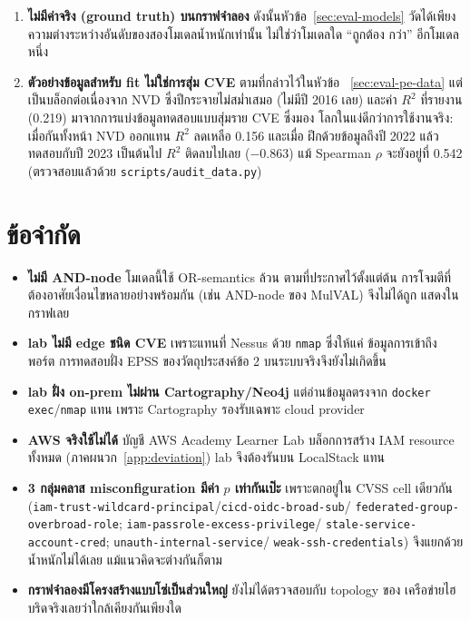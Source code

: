 \begin{enumerate}[leftmargin=1.6em]
\item \textbf{ไม่มีค่าจริง (ground truth) บนกราฟจำลอง} ดังนั้นหัวข้อ~\ref{sec:eval-models}
วัดได้เพียงความต่างระหว่างอันดับของสองโมเดลน้ำหนักเท่านั้น ไม่ใช่ว่าโมเดลใด ``ถูกต้อง
กว่า'' อีกโมเดลหนึ่ง

\item \textbf{ตัวอย่างข้อมูลสำหรับ fit ไม่ใช่การสุ่ม CVE} ตามที่กล่าวไว้ในหัวข้อ~
\ref{sec:eval-pe-data} แต่เป็นบล็อกต่อเนื่องจาก NVD ซึ่งปีกระจายไม่สม่ำเสมอ (ไม่มีปี 2016
เลย) และค่า $R^2$ ที่รายงาน (0.219) มาจากการแบ่งข้อมูลทดสอบแบบสุ่มราย CVE ซึ่งมอง
โลกในแง่ดีกว่าการใช้งานจริง: เมื่อกันทั้งหน้า NVD ออกแทน $R^2$ ลดเหลือ 0.156 และเมื่อ
ฝึกด้วยข้อมูลถึงปี 2022 แล้วทดสอบกับปี 2023 เป็นต้นไป $R^2$ ติดลบไปเลย ($-0.863$) แม้
Spearman $\rho$ จะยังอยู่ที่ 0.542 (ตรวจสอบแล้วด้วย \texttt{scripts/audit\_data.py})

\end{enumerate}

\section{ข้อจำกัด}\label{sec:eval-limits}
\begin{itemize}[leftmargin=1.4em]
\item \textbf{ไม่มี AND-node} โมเดลนี้ใช้ OR-semantics ล้วน ตามที่ประกาศไว้ตั้งแต่ต้น
การโจมตีที่ต้องอาศัยเงื่อนไขหลายอย่างพร้อมกัน (เช่น AND-node ของ MulVAL) จึงไม่ได้ถูก
แสดงในกราฟเลย
\item \textbf{lab ไม่มี edge ชนิด CVE} เพราะแทนที่ Nessus ด้วย \texttt{nmap} ซึ่งให้แค่
ข้อมูลการเข้าถึงพอร์ต การทดสอบฝั่ง EPSS ของวัตถุประสงค์ข้อ 2 บนระบบจริงจึงยังไม่เกิดขึ้น
\item \textbf{lab ฝั่ง on-prem ไม่ผ่าน Cartography/Neo4j} แต่อ่านข้อมูลตรงจาก
\texttt{docker exec}/\texttt{nmap} แทน เพราะ Cartography รองรับเฉพาะ cloud provider
\item \textbf{AWS จริงใช้ไม่ได้} บัญชี AWS Academy Learner Lab บล็อกการสร้าง IAM
resource ทั้งหมด (ภาคผนวก~\ref{app:deviation}) lab จึงต้องรันบน LocalStack แทน
\item \textbf{3 กลุ่มคลาส misconfiguration มีค่า $p$ เท่ากันเป๊ะ} เพราะตกอยู่ใน CVSS
cell เดียวกัน (\texttt{iam-trust-wildcard-principal}/\texttt{cicd-oidc-broad-sub}/
\texttt{federated-group-overbroad-role}; \texttt{iam-passrole-excess-privilege}/
\texttt{stale-service-account-cred}; \texttt{unauth-internal-service}/
\texttt{weak-ssh-credentials}) จึงแยกด้วยน้ำหนักไม่ได้เลย แม้แนวคิดจะต่างกันก็ตาม
\item \textbf{กราฟจำลองมีโครงสร้างแบบโซ่เป็นส่วนใหญ่} ยังไม่ได้ตรวจสอบกับ topology ของ
เครือข่ายไฮบริดจริงเลยว่าใกล้เคียงกันเพียงใด
\end{itemize}
